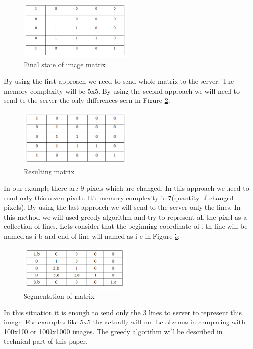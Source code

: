 \begin{figure}[h]
    \centering
    \includegraphics[width=0.5\textwidth, height=0.35\textwidth]{Figures/last_image_matrix}
    \caption{Final state of image matrix}
    \label{fig:last_image_matrix}
\end{figure}


By using the first approach we need to send whole matrix to the server. The memory complexity will be 5x5. By using the second approach we will need to send to the server the only differences seen in Figure \ref{fig:result_matrix}:

\begin{figure}[h]
    \centering
    \includegraphics[width=0.5\textwidth, height=0.35\textwidth]{Figures/result_matrix}
    \caption{Resulting matrix}
    \label{fig:result_matrix}
\end{figure}

In our example there are 9 pixels which are changed. In this approach we need to send only this seven pixels. It’s memory complexity is 7(quantity of changed pixels). By using the last approach we will send to the server only the lines. In this method we will used greedy algorithm and try to represent all the pixel as a collection of lines. Lets consider that the beginning coordinate of i-th line will be named as i-b and end of line will named as i-e in Figure \ref{fig:segmentation_result}:

\begin{figure}[h!]
    \centering
    \includegraphics[width=0.5\textwidth, height=0.35\textwidth]{Figures/segmentation_result}
    \caption{Segmentation of matrix}
    \label{fig:segmentation_result}
\end{figure}


In this situation it is enough to send only the 3 lines to server to represent this image. For examples like 5x5 the actually will not be obvious in comparing with 100x100 or 1000x1000 images. The greedy algorithm will be described in technical part of this paper.
